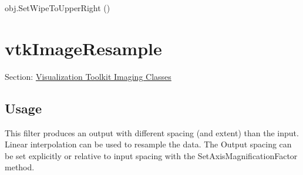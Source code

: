 \begin{DoxyItemize}
\item {\ttfamily obj.\-Set\-Wipe\-To\-Upper\-Right ()}  
\end{DoxyItemize}\hypertarget{vtkimaging_vtkimageresample}{}\section{vtk\-Image\-Resample}\label{vtkimaging_vtkimageresample}
Section\-: \hyperlink{sec_vtkimaging}{Visualization Toolkit Imaging Classes} \hypertarget{vtkwidgets_vtkxyplotwidget_Usage}{}\subsection{Usage}\label{vtkwidgets_vtkxyplotwidget_Usage}
This filter produces an output with different spacing (and extent) than the input. Linear interpolation can be used to resample the data. The Output spacing can be set explicitly or relative to input spacing with the Set\-Axis\-Magnification\-Factor method.

